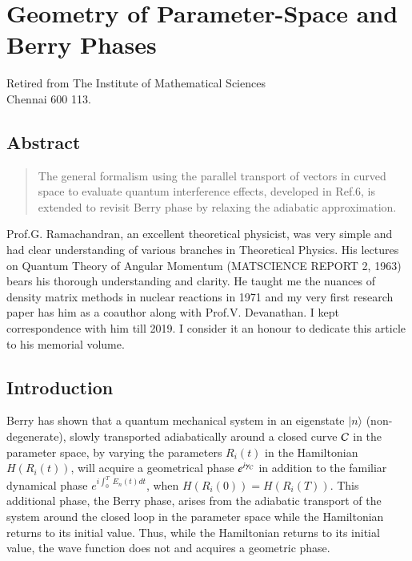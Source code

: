 
\chapter[Geometry of Parameter-Space and Berry Phases]{Geometry of Parameter-Space and Berry Phases}


\begin{center}
Retired from The Institute of Mathematical Sciences \\
Chennai 600 113.
\end{center}

\section*{Abstract}

\begin{quote}
The general formalism using the parallel transport of vectors in curved space to evaluate quantum interference effects,  developed in Ref.6, is extended to revisit Berry phase by relaxing the adiabatic approximation. 
\end{quote}

\vspace{0.5cm}
\vspace{0.5cm}

Prof.G. Ramachandran, an excellent theoretical physicist, was very simple and had clear understanding of  various branches in Theoretical Physics. His lectures on Quantum Theory of Angular Momentum  (MATSCIENCE REPORT 2, 1963) bears his  thorough understanding and clarity. He taught me the nuances of density matrix methods in nuclear  reactions in 1971 and my very first research paper has him as a coauthor along with Prof.V. Devanathan. I kept correspondence with him till 2019. I consider it an honour to dedicate this  article to his memorial volume.

\section{Introduction}\label{chap4-sec1}

Berry \cite{key1} has shown that a quantum mechanical system in an eigenstate $|n\rangle$ (non-degenerate), slowly transported  adiabatically around a closed curve ${\cal{C}}$ in the parameter space, by varying the parameters $R_i(t)$ in the  Hamiltonian $H(R_i(t))$, will acquire a geometrical phase $e^{i{\gamma}_{\cal{C}}}$ in addition to the familiar dynamical  phase $e^{i\int_0^T\ E_n(t)dt}$, when $H(R_i(0))=H(R_i(T))$. This additional phase, the Berry phase, arises from the  adiabatic transport of the system around the closed loop in the parameter space while the Hamiltonian returns to its  initial value. Thus, while the Hamiltonian returns to its initial value, the wave function does not and  acquires a geometric phase. 

